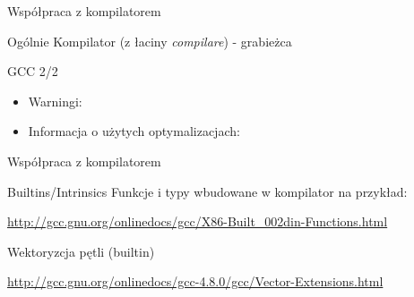 \begin{frame}[fragile]{Współpraca z kompilatorem}
	\begin{block}{Ogólnie}
	 Kompilator (z łaciny \textit{compilare}) - grabieżca %
	\end{block}
	\begin{block}{GCC 2/2}
 		\begin{itemize}
			\item Warningi:
			\begin{itemize}
			 \item \verb*%-Wall%
			 \item \verb*%-Wextra%
			 \item \verb*%-Werror%
			 \item \verb*%-pedantic%
			 \item \verb*%-Wfloat-equal% //ciekawostka
			\end{itemize}
 			\item Informacja o użytych optymalizacjach:
 			 \begin{itemize}
				\item \verb*%-fstack-usage%
				\item \verb*%-ftree-vectorizer-verbose%
				\item \verb*%-fdump-tree-{vectorize,optimize}=stderr%
				\item \verb*%-fopt-info-{optimized,vec-missed}%
			 \end{itemize}
		\end{itemize}
	\end{block}
\end{frame}
\begin{frame}[fragile]{Współpraca z kompilatorem}
	\begin{block}{Builtins/Intrinsics}
		Funkcje i typy wbudowane w kompilator na przykład:
		\begin{itemize}
			\item \verb*%__builtin_expects({G_LIKELY,G_UNLIKELY})%
			\item \verb*%__builtin_cpu_supports("sse2")%
			\item \verb*%__m64 avariable%
		\end{itemize}
		\url{http://gcc.gnu.org/onlinedocs/gcc/X86-Built_002din-Functions.html}
	\end{block}
	\begin{block}{Wektoryzcja pętli (builtin)}
 		\begin{itemize}
			\item \verb*%__m64 _mm_add_pi16%
			\item \verb*%__m64 _mm_mullo_pi16%
			\item \verb*%__m64 _mm_min_ps%
 		\end{itemize}
 		\url{http://gcc.gnu.org/onlinedocs/gcc-4.8.0/gcc/Vector-Extensions.html}
 	\end{block}
\end{frame}
